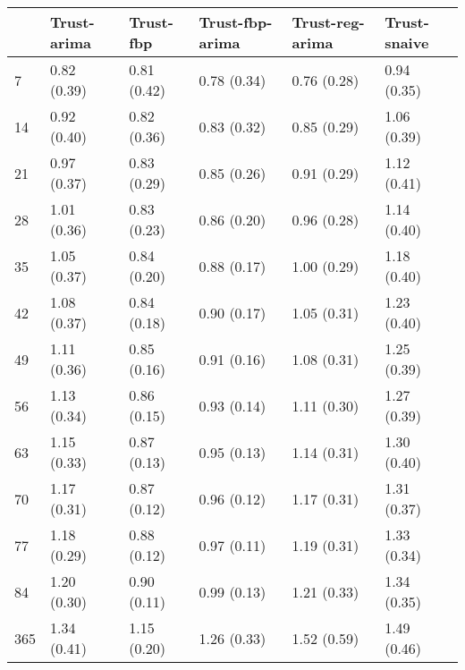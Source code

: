 \begin{tabular}{llllll}
\toprule
{} &  Trust-arima &    Trust-fbp & Trust-fbp-arima & Trust-reg-arima & Trust-snaive \\
\midrule
7   &  0.82 (0.39) &  0.81 (0.42) &     0.78 (0.34) &     0.76 (0.28) &  0.94 (0.35) \\
14  &  0.92 (0.40) &  0.82 (0.36) &     0.83 (0.32) &     0.85 (0.29) &  1.06 (0.39) \\
21  &  0.97 (0.37) &  0.83 (0.29) &     0.85 (0.26) &     0.91 (0.29) &  1.12 (0.41) \\
28  &  1.01 (0.36) &  0.83 (0.23) &     0.86 (0.20) &     0.96 (0.28) &  1.14 (0.40) \\
35  &  1.05 (0.37) &  0.84 (0.20) &     0.88 (0.17) &     1.00 (0.29) &  1.18 (0.40) \\
42  &  1.08 (0.37) &  0.84 (0.18) &     0.90 (0.17) &     1.05 (0.31) &  1.23 (0.40) \\
49  &  1.11 (0.36) &  0.85 (0.16) &     0.91 (0.16) &     1.08 (0.31) &  1.25 (0.39) \\
56  &  1.13 (0.34) &  0.86 (0.15) &     0.93 (0.14) &     1.11 (0.30) &  1.27 (0.39) \\
63  &  1.15 (0.33) &  0.87 (0.13) &     0.95 (0.13) &     1.14 (0.31) &  1.30 (0.40) \\
70  &  1.17 (0.31) &  0.87 (0.12) &     0.96 (0.12) &     1.17 (0.31) &  1.31 (0.37) \\
77  &  1.18 (0.29) &  0.88 (0.12) &     0.97 (0.11) &     1.19 (0.31) &  1.33 (0.34) \\
84  &  1.20 (0.30) &  0.90 (0.11) &     0.99 (0.13) &     1.21 (0.33) &  1.34 (0.35) \\
365 &  1.34 (0.41) &  1.15 (0.20) &     1.26 (0.33) &     1.52 (0.59) &  1.49 (0.46) \\
\bottomrule
\end{tabular}
